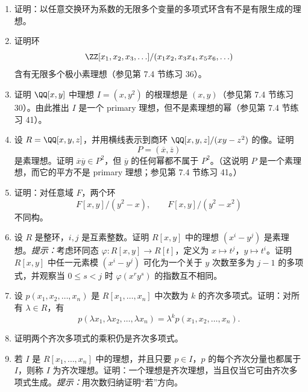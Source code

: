 \begin{enumerate}[label=\arabic*.]
	\item 证明：以任意交换环为系数的无限多个变量的多项式环含有不是有限生成的理想。
	
	\item 证明环
	\[
	\ZZ[x_1,x_2,x_3,\ldots]/(x_1x_2,x_3x_4,x_5x_6,\ldots)
	\]
	含有无限多个极小素理想（参见第 7.4 节练习 36）。
	
	\item 证明 $\QQ[x,y]$ 中理想 $I=(x,y^2)$ 的根理想是 $(x,y)$（参见第 7.4 节练习 30）。由此推出 $I$ 是一个 primary 理想，但不是素理想的幂（参见第 7.4 节练习 41）。
	
	\item 设 $R=\QQ[x,y,z]$，并用横线表示到商环 $\QQ[x,y,z]/(xy-z^2)$ 的像。证明
	\[
	P=(\overline{x},\overline{z})
	\]
	是素理想。证明 $\overline{x}\overline{y}\in P^2$，但 $\overline{y}$ 的任何幂都不属于 $P^2$。（这说明 $P$ 是一个素理想，而它的平方不是 primary 理想；参见第 7.4 节练习 41。）
	
	\item 证明：对任意域 $F$，两个环
	\[
	F[x,y]/(y^2-x),\qquad F[x,y]/(y^2-x^2)
	\]
	不同构。
	
	\item 设 $R$ 是整环，$i,j$ 是互素整数。证明 $R[x,y]$ 中的理想 $(x^i-y^j)$ 是素理想。\emph{提示：}考虑环同态 $\varphi:R[x,y]\to R[t]$，定义为 $x\mapsto t^j$，$y\mapsto t^i$。证明 $R[x,y]$ 中任一元素模 $(x^i-y^j)$ 可化为一个关于 $y$ 次数至多为 $j-1$ 的多项式，并观察当 $0\leq s<j$ 时 $\varphi(x^r y^s)$ 的指数互不相同。
	
	\item 设 $p(x_1,x_2,\ldots,x_n)$ 是 $R[x_1,\ldots,x_n]$ 中次数为 $k$ 的齐次多项式。证明：对所有 $\lambda\in R$，有
	\[
	p(\lambda x_1,\lambda x_2,\ldots,\lambda x_n)=\lambda^k p(x_1,x_2,\ldots,x_n).
	\]
	
	\item 证明两个齐次多项式的乘积仍是齐次多项式。
	
	\item 若 $I$ 是 $R[x_1,\ldots,x_n]$ 中的理想，并且只要 $p\in I$，$p$ 的每个齐次分量也都属于 $I$，则称 $I$ 为齐次理想。证明：一个理想是齐次理想，当且仅当它可由齐次多项式生成。\emph{提示：}用次数归纳证明“若”方向。
	

\end{enumerate}
